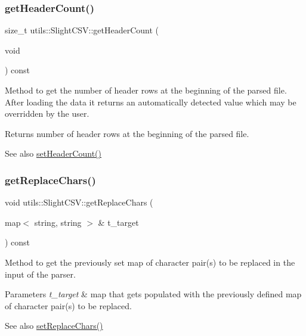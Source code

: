 \subsubsection{\texorpdfstring{get\+Header\+Count()}{getHeaderCount()}}
{\footnotesize\ttfamily size\+\_\+t utils\+::\+Slight\+C\+S\+V\+::get\+Header\+Count (\begin{DoxyParamCaption}\item[{void}]{ }\end{DoxyParamCaption}) const}

Method to get the number of header rows at the beginning of the parsed file. After loading the data it returns an automatically detected value which may be overridden by the user. \begin{DoxyReturn}{Returns}
number of header rows at the beginning of the parsed file. 
\end{DoxyReturn}
\begin{DoxySeeAlso}{See also}
\hyperlink{classutils_1_1SlightCSV_aae3c78a070879263d270a494e1dfcbca}{set\+Header\+Count()} 
\end{DoxySeeAlso}
\mbox{\label{classutils_1_1SlightCSV_a4223375a011075fe889fc82db2babe4e}} 
\subsubsection{\texorpdfstring{get\+Replace\+Chars()}{getReplaceChars()}}
{\footnotesize\ttfamily void utils\+::\+Slight\+C\+S\+V\+::get\+Replace\+Chars (\begin{DoxyParamCaption}\item[{map$<$ string, string $>$ \&}]{t\+\_\+target }\end{DoxyParamCaption}) const}

Method to get the previously set map of character pair(s) to be replaced in the input of the parser. 
\begin{DoxyParams}{Parameters}
{\em t\+\_\+target} & map that gets populated with the previously defined map of character pair(s) to be replaced. \\
\hline
\end{DoxyParams}
\begin{DoxySeeAlso}{See also}
\hyperlink{classutils_1_1SlightCSV_a53c0ef807f8b40b124ffcda2df863b5f}{set\+Replace\+Chars()} 
\end{DoxySeeAlso}
\mbox{\label{classutils_1_1SlightCSV_a5c01d4b065101c784daf05b8916307b1}} 
